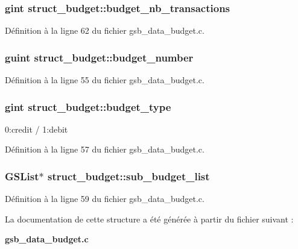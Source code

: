 \subsubsection[{budget\_\-nb\_\-transactions}]{\setlength{\rightskip}{0pt plus 5cm}gint {\bf struct\_\-budget::budget\_\-nb\_\-transactions}}\label{structstruct__budget_a2f26c2e922e6467abd1d382f3dedd1c8}


Définition à la ligne 62 du fichier gsb\_\-data\_\-budget.c.

\subsubsection[{budget\_\-number}]{\setlength{\rightskip}{0pt plus 5cm}guint {\bf struct\_\-budget::budget\_\-number}}\label{structstruct__budget_aec66874d02de625149f1c315b9646116}


Définition à la ligne 55 du fichier gsb\_\-data\_\-budget.c.

\subsubsection[{budget\_\-type}]{\setlength{\rightskip}{0pt plus 5cm}gint {\bf struct\_\-budget::budget\_\-type}}\label{structstruct__budget_a2dad46d2ca3215338b0a539cfab00d0c}
0:credit / 1:debit 

Définition à la ligne 57 du fichier gsb\_\-data\_\-budget.c.

\subsubsection[{sub\_\-budget\_\-list}]{\setlength{\rightskip}{0pt plus 5cm}GSList$\ast$ {\bf struct\_\-budget::sub\_\-budget\_\-list}}\label{structstruct__budget_a1758575e063afc8ee01f7171b3b87367}


Définition à la ligne 59 du fichier gsb\_\-data\_\-budget.c.



La documentation de cette structure a été générée à partir du fichier suivant :\begin{DoxyCompactItemize}
\item 
{\bf gsb\_\-data\_\-budget.c}\end{DoxyCompactItemize}
